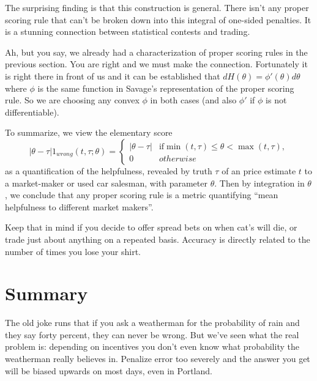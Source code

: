 The surprising finding is that this construction is general. There isn't any proper scoring rule that can't be broken down into this integral of one-sided penalties. It is a stunning connection between statistical contests and trading. 

Ah, but you say, we already had a characterization of proper scoring rules in the previous section. You are right and we must make the connection. Fortunately it is right there in front of us and it can be established that $dH(\theta) = \phi'(\theta)d\theta$ where $\phi$ is the same function in Savage's representation of the proper scoring rule. So we are choosing any convex $\phi$  in both cases (and also $\phi'$ if $\phi$ is not differentiable). 

To summarize, we view the elementary score 
$$|\theta - \tau|1_{wrong}(t,\tau;\theta) = \left\{ \begin{array}{ll} |\theta - \tau| & \textrm{if} \min(t,\tau)\le \theta < \max(t,\tau), \\ 0 & otherwise \end{array} \right. $$ as a quantification of the helpfulness, revealed by truth $\tau$ of an price estimate $t$ to a market-maker or used car salesman, with parameter $\theta$. Then by integration in $\theta$, we conclude that any proper scoring rule is a metric quantifying ``mean helpfulness to different market makers''. 

Keep that in mind if you decide to offer spread bets on when cat's will die, or trade just about anything on a repeated basis. Accuracy is directly related to the number of times you lose your shirt. 





\section{Summary}

The old joke runs that if you ask a weatherman for the probability of rain and they say forty percent, they can never be wrong. But we've seen what the real problem is: depending on incentives you don't even know what probability the weatherman really believes in. Penalize error too severely and the answer you get will be biased upwards on most days, even in Portland.

